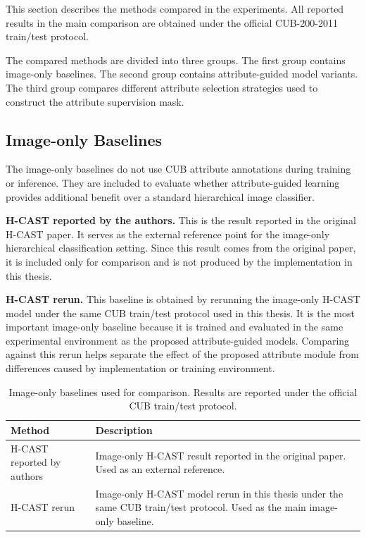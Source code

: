 This section describes the methods compared in the experiments. All reported results in the main comparison are obtained under the official CUB-200-2011 train/test protocol.

The compared methods are divided into three groups. The first group contains image-only baselines. The second group contains attribute-guided model variants. The third group compares different attribute selection strategies used to construct the attribute supervision mask.

\subsection{Image-only Baselines}

The image-only baselines do not use CUB attribute annotations during training or inference. They are included to evaluate whether attribute-guided learning provides additional benefit over a standard hierarchical image classifier.

\textbf{H-CAST reported by the authors.} This is the result reported in the original H-CAST paper. It serves as the external reference point for the image-only hierarchical classification setting. Since this result comes from the original paper, it is included only for comparison and is not produced by the implementation in this thesis.

\textbf{H-CAST rerun.} This baseline is obtained by rerunning the image-only H-CAST model under the same CUB train/test protocol used in this thesis. It is the most important image-only baseline because it is trained and evaluated in the same experimental environment as the proposed attribute-guided models. Comparing against this rerun helps separate the effect of the proposed attribute module from differences caused by implementation or training environment.

\begin{table}[t]
    \centering
    \caption{Image-only baselines used for comparison. Results are reported under the official CUB train/test protocol.}
    \label{tab:image_only_baselines}
    \begin{tabular}{l p{8.5cm}}
        \hline
        \textbf{Method} & \textbf{Description} \\
        \hline
        H-CAST reported by authors & Image-only H-CAST result reported in the original paper. Used as an external reference. \\
        H-CAST rerun & Image-only H-CAST model rerun in this thesis under the same CUB train/test protocol. Used as the main image-only baseline. \\
        \hline
    \end{tabular}
\end{table}

